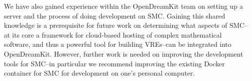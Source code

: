 \documentclass{deliverablereport}
\begin{document}
We have also gained experience within the OpenDreamKit team on setting up a
\SMC server and the process of doing development on SMC.  Gaining this shared
knowledge is a prerequisite for future work on determining what aspects of
SMC--at its core a framework for cloud-based hosting of complex mathematical
software, and thus a powerful tool for building VREs--can be integrated into
OpenDreamKit.  However, further work is needed on improving the development
tools for SMC--in particular we recommend improving the existing Docker
container for SMC for development on one's personal computer.


\printbibliography
\end{document}
